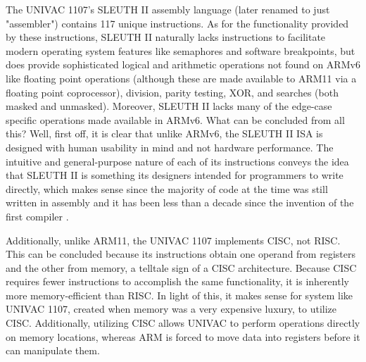 \documentclass[onecolumn, draftclsnofoot, 10pt, compsoc]{IEEEtran}
\begin{document}
The UNIVAC 1107's SLEUTH II assembly language (later renamed to just "assembler") contains 117 unique instructions. As for the functionality provided by these instructions, SLEUTH II naturally lacks instructions to facilitate modern operating system features like semaphores and software breakpoints, but does provide sophisticated logical and arithmetic operations not found on ARMv6 like floating point operations (although these are made available to ARM11 via a floating point coprocessor), division, parity testing, XOR, and searches (both masked and unmasked). Moreover, SLEUTH II lacks many of the edge-case specific operations made available in ARMv6. What can be concluded from all this? Well, first off, it is clear that unlike ARMv6, the SLEUTH II ISA is designed with human usability in mind and not hardware performance. The intuitive and general-purpose nature of each of its instructions conveys the idea that SLEUTH II is something its designers intended for programmers to write directly, which makes sense since the majority of code at the time was still written in assembly and it has been less than a decade since the invention of the first compiler \cite{compilers}.

Additionally, unlike ARM11, the UNIVAC 1107 implements CISC, not RISC. This can be concluded because its instructions obtain one operand from registers and the other from memory, a telltale sign of a CISC architecture. Because CISC requires fewer instructions to accomplish the same functionality, it is inherently more memory-efficient than RISC. In light of this, it makes sense for system like UNIVAC 1107, created when memory was a very expensive luxury, to utilize CISC. Additionally, utilizing CISC allows UNIVAC to perform operations directly on memory locations, whereas ARM is forced to move data into registers before it can manipulate them.
\end{document}
